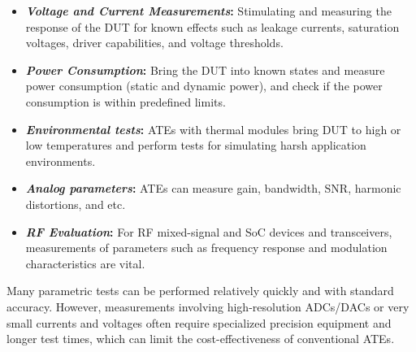 \begin{itemize}[topsep=8pt,itemsep=4pt,partopsep=4pt, parsep=4pt]

    \item \textbf{\emph{Voltage and Current Measurements}:}
    Stimulating and measuring the response of the \ac{DUT} for known effects
    such as leakage currents, saturation voltages, driver capabilities, and
    voltage thresholds.

    \item \textbf{\emph{Power Consumption}:}
    Bring the \ac{DUT} into known states and measure power
    consumption (static and dynamic power), and check if the
    power consumption is within predefined limits.

    \item \textbf{\emph{Environmental tests}:}
    \acp{ATE} with thermal modules bring
    \ac{DUT} to high or low temperatures and perform tests for simulating
    harsh application environments.

    \item \textbf{\emph{Analog parameters}:}
    \acp{ATE} can measure gain, bandwidth, \ac{SNR}, harmonic distortions,
    and etc.

    \item \textbf{\emph{\ac{RF} Evaluation}:}
    For \ac{RF} mixed-signal and \ac{SoC} devices and transceivers,
    measurements of parameters such as frequency response and
    modulation characteristics are vital.
\end{itemize}

Many parametric tests can be performed relatively quickly and with standard accuracy. 
However, measurements involving high-resolution \ac{ADC}s/\ac{DAC}s or very small currents 
and voltages often require specialized precision equipment and longer test times, which can 
limit the cost-effectiveness of conventional \acp{ATE}.